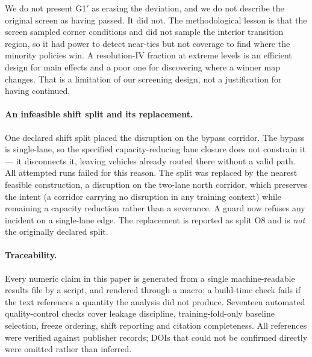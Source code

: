 We do not present G1$'$ as erasing the deviation, and we do not describe the
original screen as having passed. It did not. The methodological lesson is that
the screen sampled corner conditions and did not sample the interior transition
region, so it had power to detect near-ties but not coverage to find where the
minority policies win. A resolution-IV fraction at extreme levels is an
efficient design for main effects and a poor one for discovering where a winner
map changes. That is a limitation of our screening design, not a justification
for having continued.

\paragraph{An infeasible shift split and its replacement.} One declared shift
split placed the disruption on the bypass corridor. The bypass is single-lane,
so the specified capacity-reducing lane closure does not constrain it --- it
disconnects it, leaving vehicles already routed there without a valid path. All
\NumRunsFailedBypass{} attempted runs failed for this reason. The split was
replaced by the nearest feasible construction, a disruption on the two-lane
north corridor, which preserves the intent (a corridor carrying no disruption in
any training context) while remaining a capacity reduction rather than a
severance. A guard now refuses any incident on a single-lane edge. The
replacement is reported as split O8 and is \emph{not} the originally declared
split.

\paragraph{Traceability.} Every numeric claim in this paper is generated from a
single machine-readable results file by a script, and rendered through a macro;
a build-time check fails if the text references a quantity the analysis did not
produce. Seventeen automated quality-control checks cover leakage discipline,
training-fold-only baseline selection, freeze ordering, shift reporting and
citation completeness. All \NumRefs{} references were verified against publisher
records; DOIs that could not be confirmed directly were omitted rather than
inferred.
